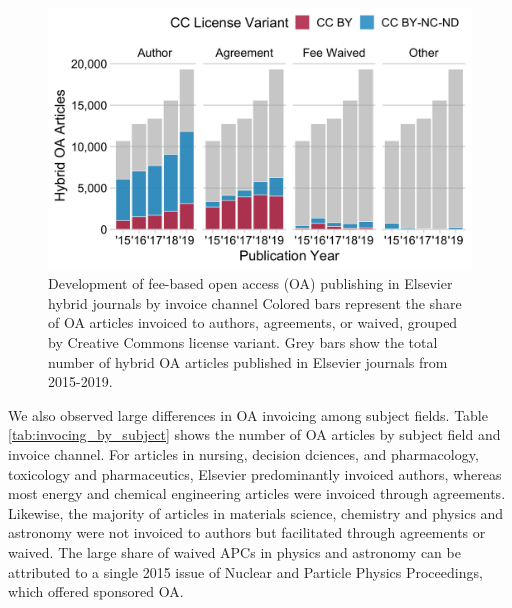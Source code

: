 \documentclass[a4paper,man,floatsintext,longtable,noextraspace,12pt]{apa6}
\begin{document}
\begin{figure}[H]

{\centering \includegraphics[width=0.7\linewidth,]{manuscript_files/figure-latex/invoiceoverview-1} 

}

\caption{Development of fee-based open access (OA) publishing in Elsevier hybrid journals by invoice channel Colored bars represent the share of OA articles invoiced to authors, agreements, or waived, grouped by Creative Commons license variant. Grey bars show the total number of hybrid OA articles published in Elsevier journals from 2015-2019.}\label{fig:invoiceoverview}
\end{figure}

We also observed large differences in OA invoicing among subject fields.
Table \ref{tab:invocing_by_subject} shows the number of OA articles by
subject field and invoice channel. For articles in nursing, decision
dciences, and pharmacology, toxicology and pharmaceutics, Elsevier
predominantly invoiced authors, whereas most energy and chemical
engineering articles were invoiced through agreements. Likewise, the
majority of articles in materials science, chemistry and physics and
astronomy were not invoiced to authors but facilitated through
agreements or waived. The large share of waived APCs in physics and
astronomy can be attributed to a single 2015 issue of Nuclear and
Particle Physics Proceedings, which offered sponsored OA.
\end{document}
